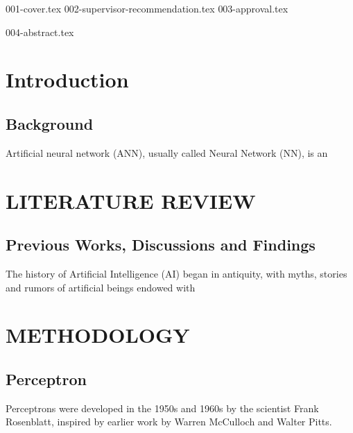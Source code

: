 \documentclass[12pt]{report}
\begin{document}
{001-cover.tex}
{002-supervisor-recommendation.tex}
{003-approval.tex}
	
	
	
\setcounter{page}{1}
{004-abstract.tex}          
\tableofcontents
	
	
\thispagestyle{empty} 
\listoffigures 
\newpage
	
\clearpage
\setcounter{page}{1}
\chapter{Introduction}
\section{Background}
Artificial neural network (ANN), usually called Neural Network (NN), is an

\chapter{LITERATURE REVIEW}
\section{Previous Works, Discussions and Findings}
The history of Artificial Intelligence (AI) began in antiquity, with myths, stories and rumors of artificial beings endowed with 	
\chapter{METHODOLOGY}
\section{Perceptron}
Perceptrons were developed in the 1950s and 1960s by the scientist Frank Rosenblatt, inspired by earlier work by Warren McCulloch and Walter Pitts.	
	
\end{document}
